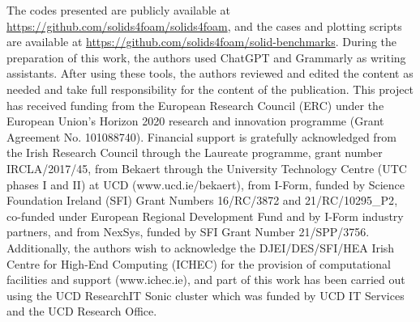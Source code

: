 \documentclass[sn-mathphys,Numbered]{sn-jnl}%
\begin{document}
\backmatter
%
%
The codes presented are publicly available at \url{https://github.com/solids4foam/solids4foam}, and the cases and plotting scripts are available at \url{https://github.com/solids4foam/solid-benchmarks}.
%
%
During the preparation of this work, the authors used ChatGPT and Grammarly as writing assistants.
After using these tools, the authors reviewed and edited the content as needed and take full responsibility for the content of the publication.
%
%
This project has received funding from the European Research Council (ERC) under the European Union’s Horizon 2020 research and innovation programme (Grant Agreement No. 101088740).
Financial support is gratefully acknowledged from the Irish Research Council
through the Laureate programme, grant number IRCLA/2017/45, from Bekaert through
the University Technology Centre (UTC phases I and II) at UCD
(www.ucd.ie/bekaert), from I-Form, funded by Science Foundation Ireland (SFI)
Grant Numbers {16/RC/3872} and {21/RC/10295\_P2}, co-funded under European Regional Development Fund and by I-Form industry partners, and from NexSys, funded by SFI Grant Number 21/SPP/3756.
Additionally, the authors wish to acknowledge the DJEI/DES/SFI/HEA Irish Centre for High-End Computing (ICHEC) for the provision of computational facilities and support (www.ichec.ie), and part of this work has been carried out using the UCD ResearchIT Sonic cluster which was funded by UCD IT Services and the UCD Research Office.
%
\newpage
%
\end{document}
